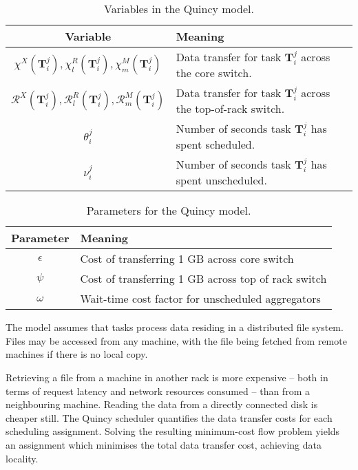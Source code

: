 \begin{table}
    \centering
    \begin{tabular}{cl}
        \textbf{Variable} & \textbf{Meaning}\tabularnewline
        \hline 
        $\chi^{X}\left(\mathbf{T}_{i}^{j}\right),\chi_{l}^{R}\left(\mathbf{T}_{i}^{j}\right),\chi_{m}^{M}\left(\mathbf{T}_{i}^{j}\right)$ & Data transfer for task $\mathbf{T}_{i}^{j}$ across the core switch.\tabularnewline %
        $\mathcal{R}^{X}\left(\mathbf{T}_{i}^{j}\right),\mathcal{R}_{l}^{R}\left(\mathbf{T}_{i}^{j}\right),\mathcal{R}_{m}^{M}\left(\mathbf{T}_{i}^{j}\right)$ & Data transfer for task $\mathbf{T}_{i}^{j}$ across the top-of-rack switch.\tabularnewline
        $\theta_{i}^{j}$ & Number of seconds task $\mathbf{T}_{i}^{j}$ has spent scheduled.\tabularnewline
        $\nu_{i}^{j}$ & Number of seconds task $\mathbf{T}_{i}^{j}$ has spent unscheduled.\tabularnewline
    \end{tabular}
    \caption[Variables in the Quincy model]{Variables in the Quincy model.}
    \label{table:quincy-variables}
\end{table}

\begin{table}
    \centering
    \begin{tabular}{cl}
        \textbf{Parameter} & \textbf{Meaning}\tabularnewline
        \hline 
        $\epsilon$ & Cost of transferring 1 GB across core switch\tabularnewline
        $\psi$ & Cost of transferring 1 GB across top of rack switch\tabularnewline
        $\omega$ & Wait-time cost factor for unscheduled aggregators\tabularnewline
    \end{tabular}
    \caption[Parameters in the Quincy model]{Parameters for the Quincy model.}
    \label{table:quincy-parameters}
\end{table}

The model assumes that tasks process data residing in a distributed file system. Files may be accessed from any machine, with the file being fetched from remote machines if there is no local copy. 

Retrieving a file from a machine in another rack is more expensive -- both in terms of request latency and network resources consumed -- than from a neighbouring machine. Reading the data from a directly connected disk is cheaper still. The Quincy scheduler quantifies the data transfer costs for each scheduling assignment. Solving the resulting minimum-cost flow problem yields an assignment which minimises the total data transfer cost, achieving data locality.

